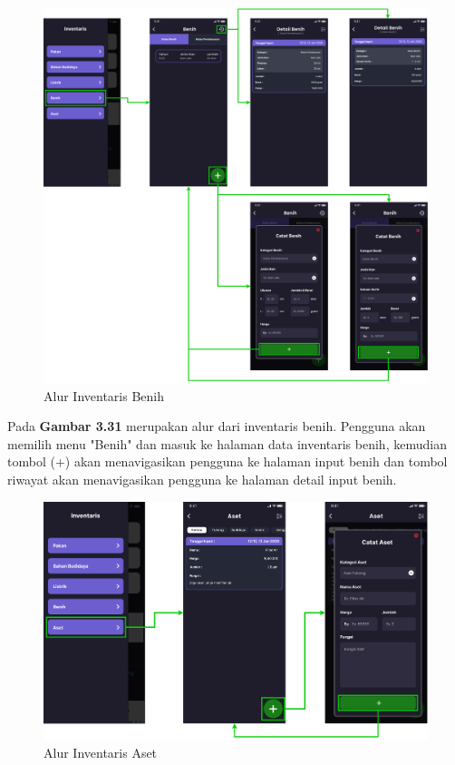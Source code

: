 \begin{spacing}{1.5}
	\begin{figure}[H]
		\centering
		\includegraphics[width=1\textwidth]{gambar/sprint2/flow_seed.png}
		\caption{Alur Inventaris Benih}
	\end{figure}

	Pada \textbf{Gambar 3.31} merupakan alur dari inventaris benih. Pengguna akan memilih menu "Benih" dan masuk ke halaman data inventaris benih, kemudian tombol (+) akan menavigasikan pengguna ke halaman input benih dan tombol riwayat akan menavigasikan pengguna ke halaman detail input benih.

	\begin{figure}[H]
		\centering
		\includegraphics[width=1\textwidth]{gambar/sprint2/flow_asset.png}
		\caption{Alur Inventaris Aset}
	\end{figure}


\end{spacing}
